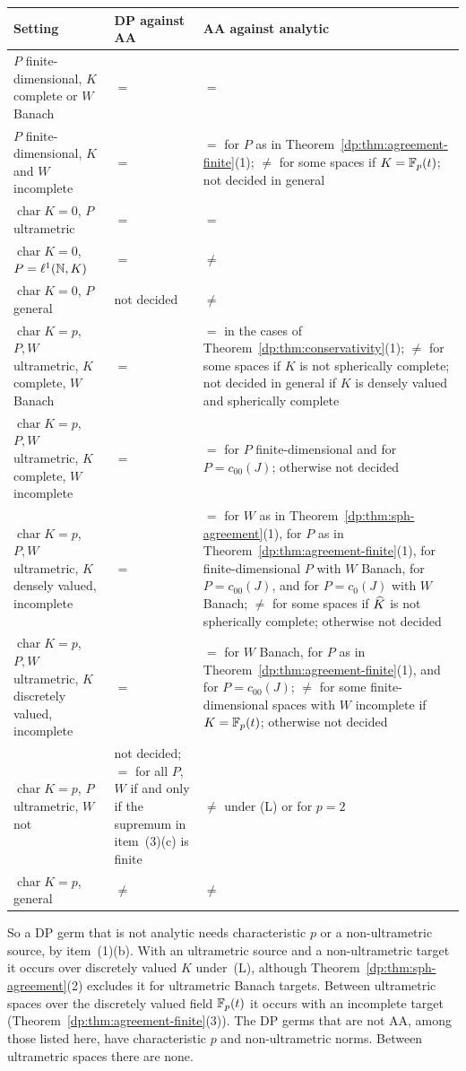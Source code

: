 \begin{center}
\small
\begin{tabular}{p{4.6cm}p{2.9cm}p{6.1cm}}
\hline
Setting & DP against AA & AA against analytic\\
\hline
$P$ finite-dimensional, $K$ complete or $W$ Banach & $=$ & $=$\\
$P$ finite-dimensional, $K$ and $W$ incomplete & $=$ & $=$ for $P$ as in Theorem~\ref{dp:thm:agreement-finite}(1); $\ne$ for some spaces if $K=\mathbb F_p(t)$; not decided in general\\
$\operatorname{char}K=0$, $P$ ultrametric & $=$ & $=$\\
$\operatorname{char}K=0$, $P=\ell^1(\mathbb N,K)$ & $=$ & $\ne$\\
$\operatorname{char}K=0$, $P$ general & not decided & $\ne$\\
$\operatorname{char}K=p$, $P,W$ ultrametric, $K$ complete, $W$ Banach & $=$ & $=$ in the cases of Theorem~\ref{dp:thm:conservativity}(1); $\ne$ for some spaces if $K$ is not spherically complete; not decided in general if $K$ is densely valued and spherically complete\\
$\operatorname{char}K=p$, $P,W$ ultrametric, $K$ complete, $W$ incomplete & $=$ & $=$ for $P$ finite-dimensional and for $P=c_{00}(J)$; otherwise not decided\\
$\operatorname{char}K=p$, $P,W$ ultrametric, $K$ densely valued, incomplete & $=$ & $=$ for $W$ as in Theorem~\ref{dp:thm:sph-agreement}(1), for $P$ as in Theorem~\ref{dp:thm:agreement-finite}(1), for finite-dimensional $P$ with $W$ Banach, for $P=c_{00}(J)$, and for $P=c_0(J)$ with $W$ Banach; $\ne$ for some spaces if $\widehat K$ is not spherically complete; otherwise not decided\\
$\operatorname{char}K=p$, $P,W$ ultrametric, $K$ discretely valued, incomplete & $=$ & $=$ for $W$ Banach, for $P$ as in Theorem~\ref{dp:thm:agreement-finite}(1), and for $P=c_{00}(J)$; $\ne$ for some finite-dimensional spaces with $W$ incomplete if $K=\mathbb F_p(t)$; otherwise not decided\\
$\operatorname{char}K=p$, $P$ ultrametric, $W$ not & not decided; $=$ for all $P$, $W$ if and only if the supremum in item~(3)(c) is finite & $\ne$ under (L) or for $p=2$\\
$\operatorname{char}K=p$, general & $\ne$ & $\ne$\\
\hline
\end{tabular}
\end{center}

So a DP germ that is not analytic needs characteristic $p$ or a non-ultrametric source, by item~(1)(b). With an ultrametric source and a non-ultrametric target it occurs over discretely valued $K$ under~(L), although Theorem~\ref{dp:thm:sph-agreement}(2) excludes it for ultrametric Banach targets. Between ultrametric spaces over the discretely valued field $\mathbb F_p(t)$ it occurs with an incomplete target (Theorem~\ref{dp:thm:agreement-finite}(3)). The DP germs that are not AA, among those listed here, have characteristic $p$ and non-ultrametric norms. Between ultrametric spaces there are none.

